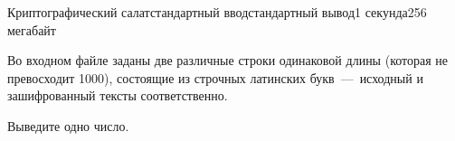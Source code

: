 \begin{problem}{Криптографический салат}{стандартный ввод}{стандартный вывод}{1 секунда}{256 мегабайт}



\InputFile
Во входном файле заданы две различные строки одинаковой длины (которая не превосходит 1000), состоящие из строчных латинских букв~---~исходный и зашифрованный тексты соответственно.

\OutputFile
Выведите одно число.

\Examples

\begin{example}
%
%
\end{example}

\end{problem}

